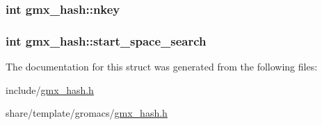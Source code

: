 \hypertarget{structgmx__hash_ac4fe44d7798f511c17de4666e5b24e76}{
\subsubsection[{nkey}]{\setlength{\rightskip}{0pt plus 5cm}int {\bf gmx\-\_\-hash\-::nkey}}}\label{structgmx__hash_ac4fe44d7798f511c17de4666e5b24e76}
\hypertarget{structgmx__hash_a3727ea6c180523c5a1bffed1e45bffaa}{
\subsubsection[{start\-\_\-space\-\_\-search}]{\setlength{\rightskip}{0pt plus 5cm}int {\bf gmx\-\_\-hash\-::start\-\_\-space\-\_\-search}}}\label{structgmx__hash_a3727ea6c180523c5a1bffed1e45bffaa}


\-The documentation for this struct was generated from the following files\-:\begin{DoxyCompactItemize}
\item 
include/\hyperlink{include_2gmx__hash_8h}{gmx\-\_\-hash.\-h}\item 
share/template/gromacs/\hyperlink{share_2template_2gromacs_2gmx__hash_8h}{gmx\-\_\-hash.\-h}\end{DoxyCompactItemize}
